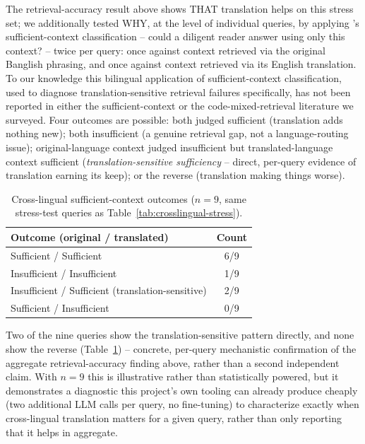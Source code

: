 \documentclass[a4paper,twoside]{article}
\begin{document}
The retrieval-accuracy result above shows THAT translation helps on this stress set; we additionally tested WHY, at the level of individual queries, by applying \citet{joren2024}'s sufficient-context classification -- could a diligent reader answer using only this context? -- twice per query: once against context retrieved via the original Banglish phrasing, and once against context retrieved via its English translation. To our knowledge this bilingual application of sufficient-context classification, used to diagnose translation-sensitive retrieval failures specifically, has not been reported in either the sufficient-context or the code-mixed-retrieval literature we surveyed. Four outcomes are possible: both judged sufficient (translation adds nothing new); both insufficient (a genuine retrieval gap, not a language-routing issue); original-language context judged insufficient but translated-language context sufficient (\emph{translation-sensitive sufficiency} -- direct, per-query evidence of translation earning its keep); or the reverse (translation making things worse).

\begin{table}[t]
\caption{Cross-lingual sufficient-context outcomes ($n=9$, same stress-test queries as Table~\ref{tab:crosslingual-stress}).}\label{tab:sufficient-context-bilingual} \centering
\begin{tabular}{|l|c|}
\hline
Outcome (original / translated) & Count \\
\hline
Sufficient / Sufficient & 6/9 \\
Insufficient / Insufficient & 1/9 \\
Insufficient / Sufficient (translation-sensitive) & 2/9 \\
Sufficient / Insufficient & 0/9 \\
\hline
\end{tabular}
\end{table}

Two of the nine queries show the translation-sensitive pattern directly, and none show the reverse (Table~\ref{tab:sufficient-context-bilingual}) -- concrete, per-query mechanistic confirmation of the aggregate retrieval-accuracy finding above, rather than a second independent claim. With $n=9$ this is illustrative rather than statistically powered, but it demonstrates a diagnostic this project's own tooling can already produce cheaply (two additional LLM calls per query, no fine-tuning) to characterize exactly when cross-lingual translation matters for a given query, rather than only reporting that it helps in aggregate.
\end{document}
